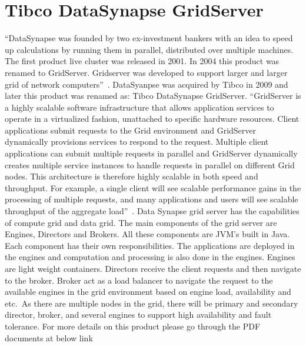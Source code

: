 \section{Tibco DataSynapse GridServer}

``DataSynapse was founded by two ex-investment bankers with an idea to
speed up calculations by running them in parallel, distributed over
multiple machines. The first product live cluster was released in
2001. In 2004 this product was renamed to GridServer. Gridserver was
developed to support larger and larger grid of network
computers''~\cite{hid-sp18-514-datasynapsewiki}. DataSyanpse was
acquired by Tibco in 2009 and later this product was renamed as: Tibco
DataSynapse GridServer\cite{hid-sp18-514-tibcodatasynapsewiki}.
``GridServer is a highly scalable software infrastructure that allows
application services to operate in a virtualized fashion, unattached
to specific hardware resources. Client applications submit requests to
the Grid environment and GridServer dynamically provisions services to
respond to the request. Multiple client applications can submit
multiple requests in parallel and GridServer dynamically creates
multiple service instances to handle requests in parallel on different
Grid nodes. This architecture is therefore highly scalable in both
speed and throughput. For example, a single client will see scalable
performance gains in the processing of multiple requests, and many
applications and users will see scalable throughput of the aggregate
load''~\cite{hid-sp18-514-tibcods}. Data Synapse grid server has the
capabilities of compute grid and data grid. The main components of the
grid server are Engines, Directors and Brokers. All these components
are JVM’s built in Java. Each component has their own
responsibilities. The applications are deployed in the engines and
computation and processing is also done in the engines. Engines are
light weight containers. Directors receive the client requests and
then navigate to the broker. Broker act as a load balancer to navigate
the request to the available engines in the grid environment based on
engine load, availability and etc.\ As there are multiple nodes in the
grid, there will be primary and secondary director, broker, and
several engines to support high availability and fault
tolerance\cite{hid-sp18-514-tibcods}. For more details on this product
please go through the PDF documents at below link

